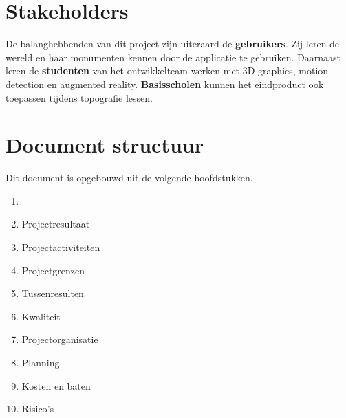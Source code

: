 \section{Stakeholders} \label{sec:stakeholders}
De balanghebbenden van dit project zijn uiteraard de \textbf{gebruikers}. Zij leren de wereld en haar monumenten kennen door de applicatie te gebruiken. Daarnaast leren de \textbf{studenten} van het ontwikkelteam werken met 3D graphics, motion detection en augmented reality. \textbf{Basisscholen} kunnen het eindproduct ook toepassen tijdens topografie lessen.

\section{Document structuur} \label{sec:structure}
Dit document is opgebouwd uit de volgende hoofdstukken.
\begin{enumerate}
	\item {}
	\item Projectresultaat
	\item Projectactiviteiten
	\item Projectgrenzen
	\item Tussenresulten
	\item Kwaliteit
	\item Projectorganisatie
	\item Planning
	\item Kosten en baten
	\item Risico's
\end{enumerate}